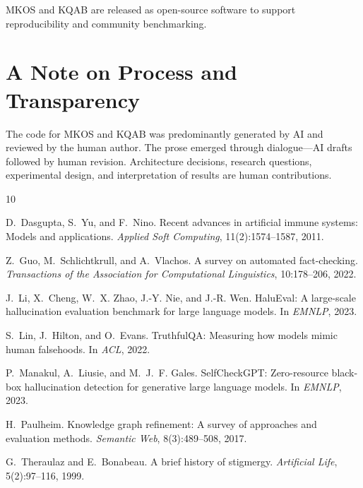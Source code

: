 \documentclass[11pt]{article}
\begin{document}
MKOS and KQAB are released as open-source software to support reproducibility and community benchmarking.

\section*{A Note on Process and Transparency}

The code for MKOS and KQAB was predominantly generated by AI and reviewed by the human author. The prose emerged through dialogue---AI drafts followed by human revision. Architecture decisions, research questions, experimental design, and interpretation of results are human contributions.


\begin{thebibliography}{10}

D.~Dasgupta, S.~Yu, and F.~Nino.
\newblock Recent advances in artificial immune systems: Models and applications.
\newblock \emph{Applied Soft Computing}, 11(2):1574--1587, 2011.

Z.~Guo, M.~Schlichtkrull, and A.~Vlachos.
\newblock A survey on automated fact-checking.
\newblock \emph{Transactions of the Association for Computational Linguistics}, 10:178--206, 2022.

J.~Li, X.~Cheng, W.~X. Zhao, J.-Y. Nie, and J.-R. Wen.
\newblock HaluEval: A large-scale hallucination evaluation benchmark for large language models.
\newblock In \emph{EMNLP}, 2023.

S.~Lin, J.~Hilton, and O.~Evans.
\newblock TruthfulQA: Measuring how models mimic human falsehoods.
\newblock In \emph{ACL}, 2022.

P.~Manakul, A.~Liusie, and M.~J.~F. Gales.
\newblock SelfCheckGPT: Zero-resource black-box hallucination detection for generative large language models.
\newblock In \emph{EMNLP}, 2023.

H.~Paulheim.
\newblock Knowledge graph refinement: A survey of approaches and evaluation methods.
\newblock \emph{Semantic Web}, 8(3):489--508, 2017.

G.~Theraulaz and E.~Bonabeau.
\newblock A brief history of stigmergy.
\newblock \emph{Artificial Life}, 5(2):97--116, 1999.


\end{thebibliography}
\end{document}
